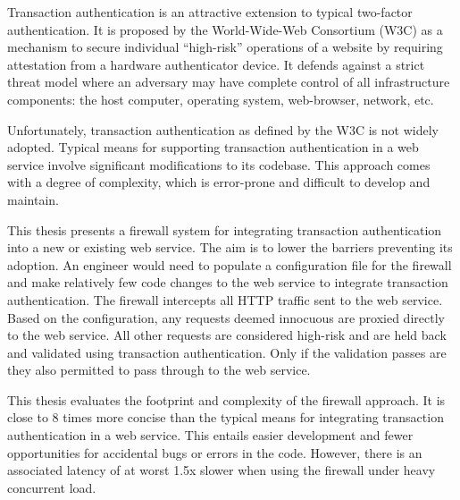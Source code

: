 % 
% 
%
Transaction authentication is an attractive extension to typical two-factor authentication. It is proposed by the World-Wide-Web Consortium (W3C) as a mechanism to secure individual ``high-risk'' operations of a website by requiring attestation from a hardware authenticator device. It defends against a strict threat model where an adversary may have complete control of all infrastructure components: the host computer, operating system, web-browser, network, etc. 

Unfortunately, transaction authentication as defined by the W3C is not widely adopted. Typical means for supporting transaction authentication in a web service involve significant modifications to its codebase. This approach comes with a degree of complexity, which is error-prone and difficult to develop and maintain.


This thesis presents a firewall system for integrating transaction authentication into a new or existing web service. The aim is to lower the barriers preventing its adoption. An engineer would need to populate a configuration file for the firewall and make relatively few code changes to the web service to integrate transaction authentication. The firewall intercepts all HTTP traffic sent to the web service. Based on the configuration, any requests deemed innocuous are proxied directly to the web service. All other requests are considered high-risk and are held back and validated using transaction authentication. Only if the validation passes are they also permitted to pass through to the web service.

This thesis evaluates the footprint and complexity of the firewall approach. It is close to 8 times more concise than the typical means for integrating transaction authentication in a web service. This entails easier development and fewer opportunities for accidental bugs or errors in the code. However, there is an associated latency of at worst 1.5x slower when using the firewall under heavy concurrent load.
